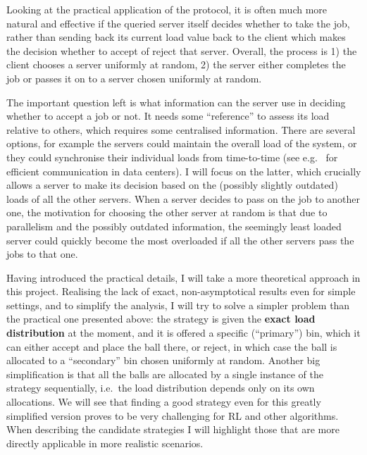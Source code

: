 Looking at the practical application of the \TwoThinning protocol, it is often much more natural and effective if the queried server itself decides whether to take the job, rather than sending back its current load value back to the client which makes the decision whether to accept of reject that server.  Overall, the process is 1) the client chooses a server uniformly at random, 2) the server either completes the job or passes it on to a server chosen uniformly at random.

The important question left is what information can the server use in deciding whether to accept a job or not. It needs some ``reference'' to assess its load relative to others, which requires some centralised information. There are several options, for example the servers could maintain the overall load of the system, or they could synchronise their individual loads from time-to-time (see e.g.~\cite{zhang2018datacenterloadbalancing} for efficient communication in data centers). I will focus on the latter, which crucially allows a server to make its decision based on the (possibly slightly outdated) loads of all the other servers. When a server decides to pass on the job to another one, the motivation for choosing the other server at random is that due to parallelism and the possibly outdated information, the seemingly least loaded server could quickly become the most overloaded if all the other servers pass the jobs to that one.


Having introduced the practical details, I will take a more theoretical approach in this project. Realising the lack of exact, non-asymptotical results even for simple settings, and to simplify the analysis, I will try to solve a simpler problem than the practical one presented above: the strategy is given the \textbf{exact load distribution} at the moment, and it is offered a specific (``primary'') bin, which it can either accept and place the ball there, or reject, in which case the ball is allocated to a ``secondary'' bin chosen uniformly at random. Another big simplification is that all the balls are allocated by a single instance of the strategy sequentially, i.e.\ the load distribution depends only on its own allocations. We will see that finding a good strategy even for this greatly simplified version proves to be very challenging for RL and other algorithms. When describing the candidate strategies I will highlight those that are more directly applicable in more realistic scenarios. 


